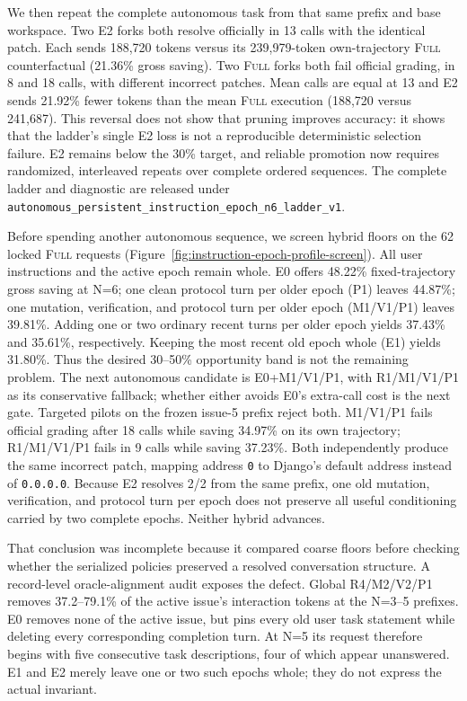 \documentclass[11pt]{article}
\begin{document}
We then repeat the complete autonomous task from that same prefix and base
workspace.  Two E2 forks both resolve officially in 13 calls with the
identical patch.  Each sends 188,720 tokens versus its 239,979-token
own-trajectory \textsc{Full} counterfactual (21.36\% gross saving).  Two
\textsc{Full} forks both fail official grading, in 8 and 18 calls, with
different incorrect patches.  Mean calls are equal at 13 and E2 sends 21.92\%
fewer tokens than the mean \textsc{Full} execution (188,720 versus 241,687).
This reversal does not show that pruning improves accuracy: it shows that the
ladder's single E2 loss is not a reproducible deterministic selection failure.
E2 remains below the 30\% target, and reliable promotion now requires
randomized, interleaved repeats over complete ordered sequences.  The complete
ladder and diagnostic are released under
\texttt{autonomous\_persistent\_instruction\_epoch\_n6\_ladder\_v1}.

Before spending another autonomous sequence, we screen hybrid floors on the
62 locked \textsc{Full} requests (Figure~\ref{fig:instruction-epoch-profile-screen}).
All user instructions and the active epoch remain whole.  E0 offers 48.22\%
fixed-trajectory gross saving at N=6; one clean protocol turn per older epoch
(P1) leaves 44.87\%; one mutation, verification, and protocol turn per older
epoch (M1/V1/P1) leaves 39.81\%.  Adding one or two ordinary recent turns per
older epoch yields 37.43\% and 35.61\%, respectively.  Keeping the most recent
old epoch whole (E1) yields 31.80\%.  Thus the desired 30--50\% opportunity
band is not the remaining problem.  The next autonomous candidate is
E0+M1/V1/P1, with R1/M1/V1/P1 as its conservative fallback; whether either
avoids E0's extra-call cost is the next gate.  Targeted pilots on the frozen
issue-5 prefix reject both.  M1/V1/P1 fails official grading after 18 calls
while saving 34.97\% on its own trajectory; R1/M1/V1/P1 fails in 9 calls while
saving 37.23\%.  Both independently produce the same incorrect patch, mapping
address \texttt{0} to Django's default address instead of \texttt{0.0.0.0}.
Because E2 resolves 2/2 from the same prefix, one old mutation, verification,
and protocol turn per epoch does not preserve all useful conditioning carried
by two complete epochs.  Neither hybrid advances.

That conclusion was incomplete because it compared coarse floors before
checking whether the serialized policies preserved a resolved conversation
structure.  A record-level oracle-alignment audit exposes the defect.  Global
R4/M2/V2/P1 removes 37.2--79.1\% of the active issue's interaction tokens at
the N=3--5 prefixes.  E0 removes none of the active issue, but pins every old
user task statement while deleting every corresponding completion turn.  At
N=5 its request therefore begins with five consecutive task descriptions,
four of which appear unanswered.  E1 and E2 merely leave one or two such
epochs whole; they do not express the actual invariant.
\end{document}
